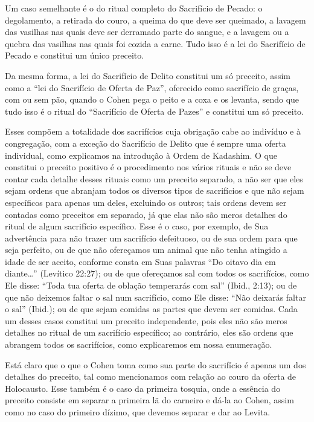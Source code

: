 Um caso semelhante é o do ritual completo do Sacrifício de Pecado:
o degolamento, a retirada do couro, a queima do que deve ser queimado, a
lavagem das vasilhas nas quais deve ser derramado parte do sangue, e a
lavagem ou a quebra das vasilhas nas quais foi cozida a carne. Tudo
isso é a lei do Sacrifício de Pecado e constitui um único preceito.

Da mesma forma, a lei do Sacrifício de Delito constitui um só preceito,
assim como a ``lei do Sacrifício de Oferta de Paz'', oferecido como
sacrifício de graças, com ou sem pão, quando o Cohen pega o peito e
a coxa e os levanta, sendo que tudo isso é o ritual do ``Sacrifício de
Oferta de Pazes'' e
constitui um só preceito.

Esses compõem a totalidade dos sacrifícios cuja obrigação cabe ao
indivíduo e à congregação, com a exceção do Sacrifício de Delito que é
sempre uma oferta individual, como explicamos na introdução à Ordem de
Kadashim.
O que constitui o preceito positivo é o procedimento nos vários rituais
e não se deve contar cada detalhe desses rituais como um preceito
separado, a não
ser que eles sejam ordens que abranjam todos os diversos tipos de
sacrifícios e que não sejam específicos para apenas um deles, excluindo
os outros; tais ordens devem ser contadas como preceitos em separado,
já que elas não são meros detalhes do ritual de algum sacrifício
específico. Esse é o caso, por exemplo, de Sua advertência para não
trazer um sacrifício defeituoso, ou de sua ordem para que seja
perfeito, ou de que não ofereçamos um animal que não tenha atingido a
idade de ser aceito, conforme consta em Suas palavras ``Do oitavo dia
em diante\ldots{}'' (Levítico 22:27); ou de que ofereçamos sal com todos os
sacrifícios, como Ele disse: ``Toda tua oferta de oblação temperarás com
sal'' (Ibid., 2:13); ou de que não deixemos faltar o sal num sacrifício,
como Ele disse: ``Não deixarás faltar o sal'' (Ibid.); ou de que sejam
comidas as partes que devem ser comidas. Cada um desses casos constitui
um preceito independente, pois eles não são meros detalhes no ritual de
um sacrifício específico; ao contrário, eles são ordens que abrangem
todos os sacrifícios, como explicaremos em nossa enumeração.

Está claro que o que o Cohen toma como sua parte do sacrifício é
apenas um dos detalhes do preceito, tal como mencionamos com relação ao
couro da oferta de Holocausto. Esse também é o caso da primeira tosquia,
onde a essência do preceito consiste em separar a primeira lã do
carneiro e dá-la ao Cohen, assim como no caso do primeiro dízimo,
que devemos separar e dar ao Levita.

